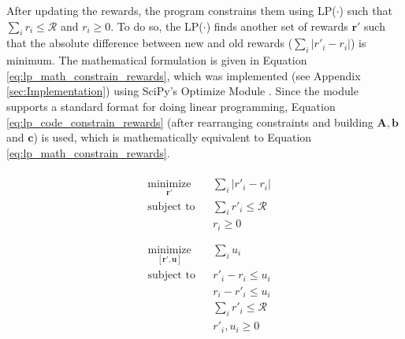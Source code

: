 \documentclass[12pt]{article}
\newcommand{\vect}[1]{\mathbf{#1}}  %
\newcommand{\matr}[1]{\mathbf{#1}}  %
\begin{document}
    After updating the rewards, the program constrains them using LP($\cdot$) such that $\sum_{i}r_i \leq \mathcal{R}$ and $r_i \geq 0$. To do so, the LP($\cdot$) finds another set of rewards $\vect{r'}$ such that the absolute difference between new and old rewards ($\sum_{i}|r'_i - r_i|$) is minimum. The mathematical formulation is given in Equation \ref{eq:lp_math_constrain_rewards}, which was implemented (see Appendix \ref{sec:Implementation}) using SciPy's Optimize Module \cite{SCPOptimizeDocs}. Since the module supports a standard format for doing linear programming, Equation \ref{eq:lp_code_constrain_rewards} (after rearranging constraints and building $\matr{A}, \vect{b}$ and $\vect{c}$) is used, which is mathematically equivalent to Equation \ref{eq:lp_math_constrain_rewards}.
    \begin{multicols}{2}
        \begin{equation} \label{eq:lp_math_constrain_rewards}
            \begin{aligned}\\
                & \underset{\vect{r'}}{\text{minimize}}
                & & \sum_{i}|r'_i - r_i|\\
                & \text{subject to}
                & & \sum_{i}r'_i \leq \mathcal{R}\\
                &&& r_i \geq 0\\ \\
            \end{aligned}
        \end{equation}\break
        \begin{equation} \label{eq:lp_code_constrain_rewards}
            \begin{aligned}
                & \underset{[\vect{r'}, \vect{u}]}{\text{minimize}}
                & & \sum_{i} u_i\\
                & \text{subject to}
                & & r'_i - r_i \leq u_i\\
                &&& r_i - r'_i \leq u_i\\
                &&& \sum_{i} r'_i \leq \mathcal{R}\\
                &&& r'_i, u_i \geq 0
            \end{aligned}
        \end{equation}
    \end{multicols}
    
\end{document}
